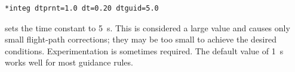 \begin{lstlisting}[style=taosmanual]
*integ dtprnt=1.0 dt=0.20 dtguid=5.0
\end{lstlisting}

sets the time constant to 5~s. This is considered a large value and causes only small
flight-path corrections; they may be too small to achieve the desired conditions.
Experimentation is sometimes required. The default value of 1~s works well for
most guidance rules.
